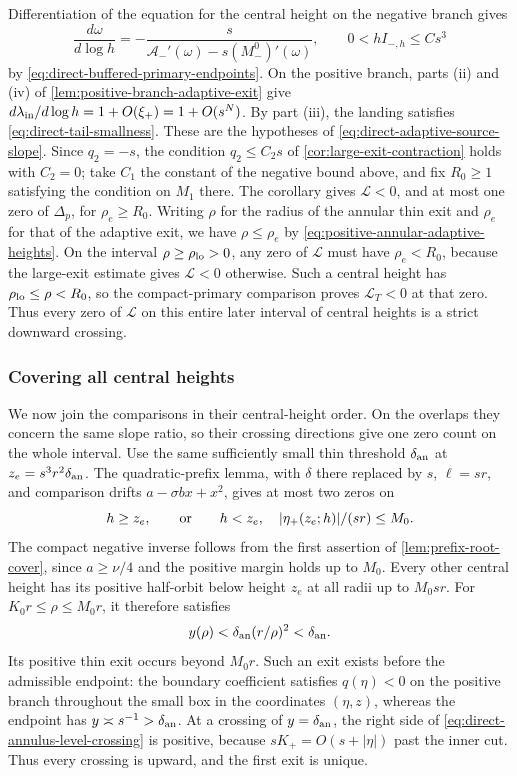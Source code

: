 Differentiation of the equation for the central height on the
negative branch gives
\[
 \frac{d\omega}{d\log h}
   =-\frac{s}{\mathcal A_-'(\omega)
                         -s(M_-^0)'(\omega)},\qquad
 0<hI_{-,h}\le Cs^3
\]
by \eqref{eq:direct-buffered-primary-endpoints}.
On the positive branch, parts (ii) and (iv) of
\cref{lem:positive-branch-adaptive-exit} give
\(d\lambda_{\rm in}/d\log h=1+O(\xi_+)=1+O(s^N)\). By part (iii), the
landing satisfies \eqref{eq:direct-tail-smallness}. These are the
hypotheses of \eqref{eq:direct-adaptive-source-slope}. Since \(q_2=-s\),
the condition \(q_2\le C_2s\) of \cref{cor:large-exit-contraction} holds
with \(C_2=0\); take \(C_1\) the constant of the negative bound above, and
fix \(R_0\ge1\) satisfying the condition on \(M_1\) there. The corollary
gives \(\mathcal L<0\), and at most one zero of \(\Delta_p\), for
\(\rho_e\ge R_0\).
Writing \(\rho\) for the radius of the annular thin exit and \(\rho_e\)
for that of the adaptive exit, we have
\(\rho\le\rho_e\) by \eqref{eq:positive-annular-adaptive-heights}.
On the interval \(\rho\ge\rho_{\rm lo}>0\),
any zero of \(\mathcal L\) must have \(\rho_e<R_0\), because
the large-exit estimate gives \(\mathcal L<0\) otherwise.
Such a central height has \(\rho_{\rm lo}\le\rho<R_0\), so the compact-primary
comparison proves \(\mathcal L_T<0\) at that zero. Thus every
zero of \(\mathcal L\) on this entire later interval of central
heights is a strict downward crossing.

\subsubsection{Covering all central heights}

We now join the comparisons in their central-height order. On the
overlaps they concern the same slope ratio, so their crossing
directions give one zero count on the whole interval.
Use the same sufficiently small thin threshold \(\delta_{\rm an}\)
at \(z_e=s^3r^2\delta_{\rm an}\). The quadratic-prefix lemma,
with \(\delta\) there replaced by \(s\), \(\ell=sr\),
and comparison drifts \(a-\sigma bx+x^2\), gives at most two
zeros on
\[
 h\ge z_e,\qquad\hbox{or}\qquad
 h<z_e,\quad |\eta_+(z_e;h)|/(sr)\le M_0 .
\]
The compact negative inverse follows from the first assertion of
\cref{lem:prefix-root-cover},
since \(a\ge\nu/4\) and the positive margin holds up to \(M_0\).
Every other central height has its positive half-orbit below
height \(z_e\) at all radii up to \(M_0sr\). For \(K_0r\le\rho\le M_0r\),
it therefore satisfies
\[
 y(\rho)<\delta_{\rm an}(r/\rho)^2<\delta_{\rm an}.
\]
Its positive thin exit occurs beyond \(M_0r\).
Such an exit exists before the admissible endpoint: the
boundary coefficient satisfies \(q(\eta)<0\) on the positive branch throughout the
small box in the coordinates \((\eta,z)\), whereas the endpoint has
\(y\asymp s^{-1}>\delta_{\rm an}\). At a crossing of \(y=\delta_{\rm an}\),
the right side of \eqref{eq:direct-annulus-level-crossing} is positive,
because \(sK_+=O(s+|\eta|)\) past the inner cut.
Thus every crossing is upward, and the first exit is unique.

